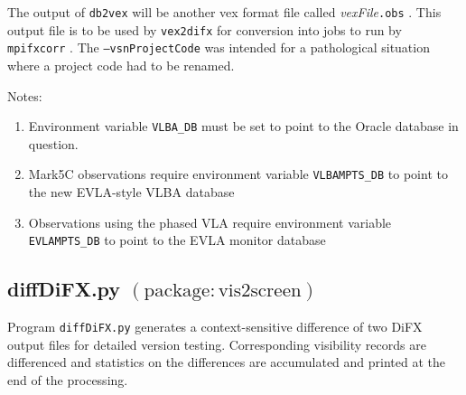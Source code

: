\noindent
The output of {\tt db2vex} will be another vex format file called {\em vexFile}{\tt .obs} .
This output file is to be used by {\tt vex2difx} for conversion into jobs to run by {\tt mpifxcorr} .
The {\tt --vsnProjectCode} was intended for a pathological situation where a project code had to be renamed.

\noindent
Notes: 
\begin{enumerate}
\item Environment variable {\tt VLBA\_DB} must be set to point to the Oracle database in question.
\item Mark5C observations require environment variable {\tt VLBAMPTS\_DB} to point to the new EVLA-style VLBA database
\item Observations using the phased VLA require environment variable {\tt EVLAMPTS\_DB} to point to the EVLA monitor database
\end{enumerate}





\subsection{diffDiFX.py {\small $\mathrm{(package: vis2screen)}$}} \label{sec:diffDiFX} 

Program {\tt diffDiFX.py} generates a context-sensitive difference of two DiFX output files for detailed version testing.  Corresponding visibility records are differenced and statistics on the differences are accumulated and printed at the end of the processing.

